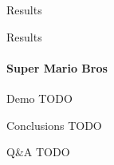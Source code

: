 \documentclass{beamer}
\begin{document}
\begin{frame}{Results}
\end{frame}



\begin{frame}{Results}
\framesubtitle{Super Mario Bros}
\end{frame}

\begin{frame}{Demo}
TODO
\end{frame}

\begin{frame}{Conclusions}
TODO
\end{frame}

\begin{frame}{Q\&A}
TODO
\end{frame}
\end{document}
